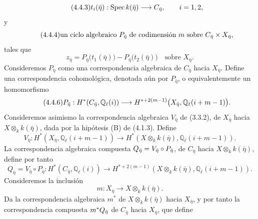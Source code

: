 \begin{equation}\tag{4.4.3}
t_i(\bar\eta):\operatorname{Spec}k(\bar\eta)
\longrightarrow\sisi{C}{C_{\bar\eta}},\qquad i=1,2,
\end{equation}
y
\begin{equation}\tag{4.4.4}
\text{un ciclo algebraico $P_{\bar\eta}$ de codimensión
$\sisi{n}{m}$ sobre $C_{\bar\eta}\times X_{\bar\eta}$},
\end{equation}
tales que
\begin{equation}\tag{4.4.5}
z_{\bar\eta}
=P_{\bar\eta}\bigl(t_1(\bar\eta)\bigr)
-P_{\bar\eta}\bigl(t_2(\bar\eta)\bigr)
\quad\text{sobre }X_{\bar\eta}.
\end{equation}
Consideremos $P_{\bar\eta}$ como una correspondencia algebraica de
$C_{\bar\eta}$ hacia $X_{\bar\eta}$. Define una correspondencia
cohomológica, denotada aún por $P_{\bar\eta}$, o equivalentemente un
homomorfismo
\begin{equation}\tag{4.4.6}
P_{\bar\eta}:H^*(C_{\bar\eta},\mathbb Q_\ell(i))
\longrightarrow
H^{*+2(m-1)}\bigl(X_{\bar\eta},
 \mathbb Q_\ell(i+m-1)\sisi{}{\bigr)}.
\end{equation}
Consideremos asimismo la correspondencia algebraica $V_{\bar\eta}$ de
(3.3.2), de $X_{\bar\eta}$ hacia $X\otimes_k k(\bar\eta)$, dada por la
hipótesis (B) de (4.1.3). Define
\begin{equation}\tag{4.4.7}
V_{\bar\eta}:H^*(X_{\bar\eta},\mathbb Q_\ell(i+m-1))
\longrightarrow
H^*(X\otimes_k k(\bar\eta),\mathbb Q_\ell(i+m-1)).
\end{equation}
La correspondencia algebraica compuesta
$Q_{\bar\eta}=V_{\bar\eta}\circ\sisi{P}{P_{\bar\eta}}$, de $C_{\bar\eta}$ hacia
$X\otimes_k k(\bar\eta)$, define por tanto
\begin{equation}\tag{4.4.8}
Q_{\bar\eta}=V_{\bar\eta}\circ P_{\bar\eta}:
H^*(C_{\bar\eta},\mathbb Q_\ell(i))
\longrightarrow
H^{*+2(m-1)}(X\otimes_k k(\bar\eta),\mathbb Q_\ell(i+m-1)).
\end{equation}
Consideremos la inclusión
\begin{equation*}
m:X_{\bar\eta}\longrightarrow X\otimes_k k(\bar\eta).
\end{equation*}
Da la correspondencia algebraica $m^*$ de
$X\otimes_k k(\bar\eta)$ hacia $X_{\bar\eta}$, y por tanto la
correspondencia compuesta
$m^*Q_{\bar\eta}\sisi{\,{}_{\bar\eta}}{}$ de $C_{\bar\eta}$ hacia
$X_{\bar\eta}$, que define

\pageoriginale


